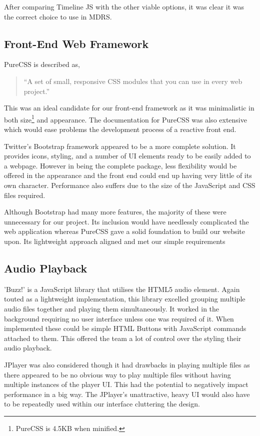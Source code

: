\documentclass{l3proj}
\begin{document}
After comparing Timeline JS with the other viable options, it was clear it was the correct choice to use in MDRS.

\subsection{Front-End Web Framework}

PureCSS\cite{pureCSS} is described as,

\blockquote{“A set of small, responsive CSS modules that you can use in every web project.”}

This was an ideal candidate for our front-end framework as it was minimalistic in both size\footnote{PureCSS is 4.5KB when minified.} and appearance. The documentation for PureCSS was also extensive which would  ease problems the development process of a reactive front end.

Twitter's Bootstrap framework appeared to be a more complete solution. It provides icons, styling, and a number of UI elements ready to be easily added to a webpage. However in being the complete package, less flexibility would be offered in the appearance and the front end could end up having very little of its own character. Performance also suffers due to the size of the \gls{JavaScript} and CSS files required.

Although Bootstrap\cite{bootstrap} had many more features, the majority of these were unnecessary for our project. Its inclusion would have needlessly complicated the web application whereas PureCSS gave a solid foundation to build our website upon. Its lightweight approach aligned and met our simple requirements


\subsection{Audio Playback}

'Buzz!'\cite{buzz} is a JavaScript library that utilises the HTML5 audio element. Again touted as a lightweight implementation, this library excelled grouping multiple audio files together and playing them simultaneously. It worked in the background requiring no user interface unless one was required of it. When implemented these could be simple HTML Buttons with JavaScript commands attached to them. This offered the team a lot of control over the styling their audio playback.

JPlayer\cite{JPlayer} was also considered though it had drawbacks in playing multiple files as there appeared to be no obvious way to play multiple files without having multiple instances of the player UI. This had the potential to negatively impact performance in a big way. The JPlayer's unattractive, heavy UI would also have to be repeatedly used within our interface cluttering the design.
\end{document}
